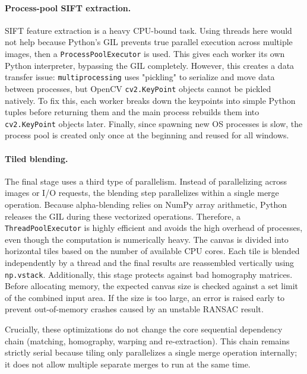 \documentclass[10pt,twocolumn,letterpaper]{article}
\begin{document}
\paragraph{Process-pool SIFT extraction.} SIFT feature extraction is a
heavy CPU-bound task. Using threads here would not help because Python's
GIL prevents true parallel execution across multiple images, then a
\texttt{ProcessPoolExecutor} is used. This gives each worker its own
Python interpreter, bypassing the GIL completely. However, this creates
a data transfer issue: \texttt{multiprocessing} uses "pickling" to
serialize and move data between processes, but OpenCV
\texttt{cv2.KeyPoint} objects cannot be pickled natively. To fix this,
each worker breaks down the keypoints into simple Python tuples before
returning them and the main process rebuilds them into
\texttt{cv2.KeyPoint} objects later. Finally, since spawning new OS
processes is slow, the process pool is created only once at the
beginning and reused for all windows.

\paragraph{Tiled blending.} The final stage uses a third type of
parallelism. Instead of parallelizing across images or I/O requests,
the blending step parallelizes within a single merge operation.
Because alpha-blending relies on NumPy array arithmetic, Python
releases the GIL during these vectorized operations. Therefore, a
\texttt{ThreadPoolExecutor} is highly efficient and avoids the high
overhead of processes, even though the computation is numerically
heavy. The canvas is divided into horizontal tiles based on the
number of available CPU cores. Each tile is blended independently
by a thread and the final results are reassembled vertically using
\texttt{np.vstack}. Additionally, this stage protects against bad
homography matrices. Before allocating memory, the expected canvas
size is checked against a set limit of the combined input area. If
the size is too large, an error is raised early to prevent
out-of-memory crashes caused by an unstable RANSAC result.

Crucially, these optimizations do not change the core sequential
dependency chain (matching, homography, warping and re-extraction).
This chain remains strictly serial because tiling only parallelizes a
single merge operation internally; it does not allow multiple separate
merges to run at the same time.
\end{document}
